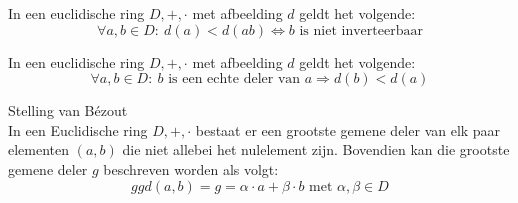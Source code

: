 \documentclass[main.tex]{subfiles}
\begin{document}
\begin{st}
  In een euclidische ring $D,+,\cdot$ met afbeelding $d$ geldt het volgende:
  \[ \forall a,b \in D:\ d(a) < d(ab) \Leftrightarrow b \text{ is niet inverteerbaar} \]
\end{st}

\begin{st}
  In een euclidische ring $D,+,\cdot$ met afbeelding $d$ geldt het volgende:
  \[ \forall a,b \in D:\ b \text{ is een echte deler van } a \Rightarrow d(b) < d(a) \]
\end{st}

\begin{st}
  Stelling van B\'ezout\\
  In een Euclidische ring $D,+,\cdot$ bestaat er een grootste gemene deler van elk paar elementen $(a,b)$ die niet allebei het nulelement zijn.
  Bovendien kan die grootste gemene deler $g$ beschreven worden als volgt:
  \[ ggd(a,b) = g = \alpha \cdot a + \beta \cdot b \text{ met }\alpha,\beta \in D \]
\end{st}

\end{document}

